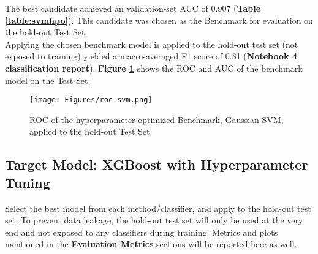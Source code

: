 \documentclass[11pt]{diazessay}
\begin{document}
The best candidate achieved an validation-set AUC of 0.907 (\textbf{Table \ref{table:svmhpo}}). This candidate was chosen as the Benchmark for evaluation on the hold-out Test Set. \\

Applying the chosen benchmark model is applied to the hold-out test set (not exposed to training) yielded a macro-averaged  F1 score of 0.81 (\textbf{Notebook 4 classification report}). \textbf{Figure \ref{fig:svm}} shows the ROC and AUC of the benchmark model on the Test Set.  \\

\begin{figure}[h]
	\centering
	\caption{ROC of the hyperparameter-optimized Benchmark, Gaussian SVM, applied to the hold-out Test Set.}
	\label{fig:svm}
	\texttt{[image: Figures/roc-svm.png]}
\end{figure}

\subsection{Target Model: XGBoost with Hyperparameter Tuning}

Select the best model from each method/classifier, and apply to the hold-out test set. To prevent data leakage, the hold-out test set will only be used at the very end and not exposed to any classifiers during training. Metrics and plots mentioned in the \textbf{Evaluation Metrics} sections will be reported here as well. \\
\end{document}

